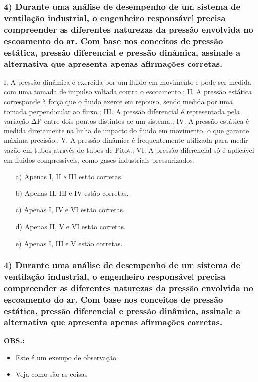 \documentclass[12pt]{beamer}
\begin{document}
\begin{frame}
\frametitle{4) Durante uma análise de desempenho de um sistema de ventilação industrial, o engenheiro responsável precisa compreender as diferentes naturezas da pressão envolvida no escoamento do ar. Com base nos conceitos de pressão estática, pressão diferencial e pressão dinâmica, assinale a alternativa que apresenta apenas afirmações corretas.}
{\BodySize
\par I. A pressão dinâmica é exercida por um fluido em movimento e pode ser medida com uma tomada de impulso voltada contra o escoamento.; II. A pressão estática corresponde à força que o fluido exerce em repouso, sendo medida por uma tomada perpendicular ao fluxo.; III. A pressão diferencial é representada pela variação ΔP entre dois pontos distintos de um sistema.; IV. A pressão estática é medida diretamente na linha de impacto do fluido em movimento, o que garante máxima precisão.; V. A pressão dinâmica é frequentemente utilizada para medir vazão em tubos através de tubos de Pitot.; VI. A pressão diferencial só é aplicável em fluidos compressíveis, como gases industriais pressurizados.
\begin{itemize}
\item[a)] Apenas I, II e III estão corretas.
\item[b)] Apenas II, III e IV estão corretas.
\item[c)] Apenas I, IV e VI estão corretas.
\item[d)] Apenas II, V e VI estão corretas.
\item[e)] \alert{Apenas I, III e V estão corretas.}
\end{itemize}
}
\end{frame}

\begin{frame}
\frametitle{4) Durante uma análise de desempenho de um sistema de ventilação industrial, o engenheiro responsável precisa compreender as diferentes naturezas da pressão envolvida no escoamento do ar. Com base nos conceitos de pressão estática, pressão diferencial e pressão dinâmica, assinale a alternativa que apresenta apenas afirmações corretas.}
{\BodySize
\textbf{OBS.:}
\begin{itemize}
\item Este é um exempo de observação
\item Veja como são as coisas
\end{itemize}
}
\end{frame}
\end{document}
